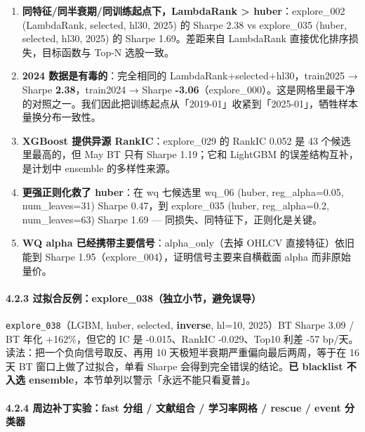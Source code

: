 \documentclass[
  fontset=fandol]{ctexart}
\providecommand{\tightlist}{%
  \setlength{\itemsep}{0pt}\setlength{\parskip}{0pt}}
\begin{document}
\begin{enumerate}
\def\labelenumi{\arabic{enumi}.}
\tightlist
\item
  \textbf{同特征/同半衰期/同训练起点下，LambdaRank
  \textgreater{} huber}：explore\_002
  (LambdaRank, selected, hl30, 2025) 的
  Sharpe 2.38 vs explore\_035 (huber,
  selected, hl30, 2025) 的 Sharpe
  1.69。差距来自 LambdaRank
  直接优化排序损失，目标函数与 Top-N
  选股一致。
\item
  \textbf{2024 数据是有毒的}：完全相同的
  LambdaRank+selected+hl30，train2025 →
  Sharpe \textbf{2.38}，train2024 →
  Sharpe
  \textbf{-3.06}（explore\_000）。这是网格里最干净的对照之一。我们因此把训练起点从「2019-01」收紧到「2025-01」，牺牲样本量换分布一致性。
\item
  \textbf{XGBoost 提供异源
  RankIC}：explore\_029 的 RankIC 0.052
  是 43 个候选里最高的，但 May BT 只有
  Sharpe 1.19；它和 LightGBM
  的误差结构互补，是计划中 ensemble
  的多样性来源。
\item
  \textbf{更强正则化救了 huber}：在 wq
  七候选里 wq\_06 (huber,
  reg\_alpha=0.05, num\_leaves=31)
  Sharpe 0.47，到 explore\_035 (huber,
  reg\_alpha=0.2, num\_leaves=63) Sharpe
  1.69 ---
  同损失、同特征下，正则化是关键。
\item
  \textbf{WQ alpha
  已经携带主要信号}：alpha\_only（去掉
  OHLCV 直接特征）依旧能到 Sharpe
  1.95（explore\_004），证明信号主要来自横截面
  alpha 而非原始量价。
\end{enumerate}

\hypertarget{ux8fc7ux62dfux5408ux53cdux4f8bexplore_038ux72ecux7acbux5c0fux8282ux907fux514dux8befux5bfc}{%
\paragraph{4.2.3
过拟合反例：explore\_038（独立小节，避免误导）}\label{ux8fc7ux62dfux5408ux53cdux4f8bexplore_038ux72ecux7acbux5c0fux8282ux907fux514dux8befux5bfc}}

\texttt{explore\_038}（LGBM, huber,
selected, \textbf{inverse}, hl=10,
2025）BT Sharpe 3.09 / BT 年化
+162\%，但它的 IC 是 -0.015、RankIC
-0.029、Top10 利差 -57
bp/天。读法：把一个负向信号取反、再用 10
天极短半衰期严重偏向最后两周，等于在 16
天 BT 窗口上做了过拟合，单看 Sharpe
会得到完全错误的结论。\textbf{已
blacklist 不入选
ensemble}，本节单列以警示「永远不能只看夏普」。

\hypertarget{ux5468ux8fb9ux8865ux4e01ux5b9eux9a8cfast-ux5206ux7ec4-ux6587ux732eux7ec4ux5408-ux5b66ux4e60ux7387ux7f51ux683c-rescue-event-ux5206ux7c7bux5668}{%
\paragraph{4.2.4 周边补丁实验：fast 分组
/ 文献组合 / 学习率网格 / rescue / event
分类器}\label{ux5468ux8fb9ux8865ux4e01ux5b9eux9a8cfast-ux5206ux7ec4-ux6587ux732eux7ec4ux5408-ux5b66ux4e60ux7387ux7f51ux683c-rescue-event-ux5206ux7c7bux5668}}
\end{document}
